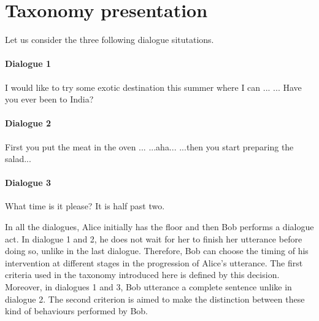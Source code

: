 \section{Taxonomy presentation}


        Let us consider the three following dialogue situtations.

        \paragraph{Dialogue 1}

        \begin{dialogue}
           I would like to try some exotic destination this summer where I can ...
           ... Have you ever been to India?
        \end{dialogue}

        \paragraph{Dialogue 2}

        \begin{dialogue}
           First you put the meat in the oven ...
           ...aha...
           ...then you start preparing the salad...
        \end{dialogue}

        \paragraph{Dialogue 3}

        \begin{dialogue}
           What time is it please?
           It is half past two.
        \end{dialogue}

        In all the dialogues, Alice initially has the floor and then Bob performs a dialogue act. In dialogue 1 and 2, he does not wait for her to finish her utterance before doing so, unlike in the last dialogue. Therefore, Bob can choose the timing of his intervention at different stages in the progression of Alice's utterance. The first criteria used in the taxonomy introduced here is defined by this decision. Moreover, in dialogues 1 and 3, Bob utterance a complete sentence unlike in dialogue 2. The second criterion is aimed to make the distinction between these kind of behaviours performed by Bob.

